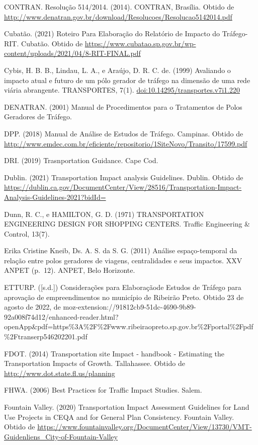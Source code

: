 \documentclass[]{article}
\begin{document}
CONTRAN. Resolução 514/2014. (2014). CONTRAN, Brasília. Obtido de
\url{http://www.denatran.gov.br/download/Resolucoes/Resolucao5142014.pdf}

Cubatão. (2021) Roteiro Para Elaboração do Relatório de Impacto do
Tráfego- RIT. Cubatão. Obtido de
\url{https://www.cubatao.sp.gov.br/wp-content/uploads/2021/04/8-RIT-FINAL.pdf}

Cybis, H. B. B., Lindau, L. A., e Araújo, D. R. C. de. (1999) Avaliando
o impacto atual e futuro de um pólo gerador de tráfego na dimensão de
uma rede viária abrangente. TRANSPORTES, 7(1).
\url{doi:10.14295/transportes.v7i1.220}

DENATRAN. (2001) Manual de Procedimentos para o Tratamentos de Polos
Geradores de Tráfego.

DPP. (2018) Manual de Análise de Estudos de Tráfego. Campinas. Obtido de
\url{http://www.emdec.com.br/eficiente/repositorio/1SiteNovo/Transito/17599.pdf}

DRI. (2019) Trasnportation Guidance. Cape Cod.

Dublin. (2021) Transportation Impact analysis Guidelines. Dublin. Obtido
de
\url{https://dublin.ca.gov/DocumentCenter/View/28516/Transportation-Impact-Analysis-Guidelines-2021?bidId=}

Dunn, R. C., e HAMILTON, G. D. (1971) TRANSPORTATION ENGINEERING DESIGN
FOR SHOPPING CENTERS. Traffic Engineering \& Control, 13(7).

Erika Cristine Kneib, Ds. A. S. da S. G. (2011) Análise espaço-temporal
da relação entre polos geradores de viagens, centralidades e seus
impactos. XXV ANPET (p.~12). ANPET, Belo Horizonte.

ETTURP. ({[}s.d.{]}) Considerações para Elaboraçãode Estudos de Tráfego
para aprovação de empreendimentos no município de Ribeirão Preto. Obtido
23 de agosto de 2022, de
moz-extension://91812cb9-51dc-4690-9b89-92a008f74d12/enhanced-reader.html?openApp\&pdf=https\%3A\%2F\%2Fwww.ribeiraopreto.sp.gov.br\%2Fportal\%2Fpdf\%2Ftranserp546202201.pdf

FDOT. (2014) Transportation site Impact - handbook - Estimating the
Transportation Impacts of Growth. Tallahassee. Obtido de
\url{http://www.dot.state.fl.us/planning}

FHWA. (2006) Best Practices for Traffic Impact Studies. Salem.

Fountain Valley. (2020) Transportation Impact Assessment Guidelines for
Land Use Projects in CEQA and for General Plan Consistency. Fountain
Valley. Obtido de
\url{https://www.fountainvalley.org/DocumentCenter/View/13730/VMT-Guidenliens_City-of-Fountain-Valley}
\end{document}
